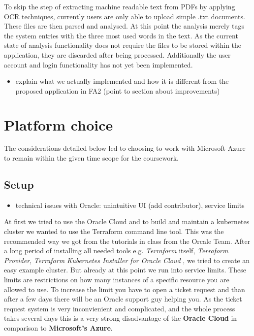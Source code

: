 \documentclass[conference]{IEEEtran}
\begin{document}
To skip the step of extracting machine readable text from PDFs by applying OCR techniques, currently users are only able to upload simple .txt documents. These files are then parsed and analysed. At this point the analysis merely tags the system entries with the three most used words in the text. As the current state of analysis functionality does not require the files to be stored within the application, they are discarded after being processed. Additionally the user account and login functionality has not yet been implemented.

\begin{itemize}
	\item explain what we actually implemented and how it is different from the proposed application in FA2 (point to section about improvements)
\end{itemize}

\section{Platform choice}
\label{sec:platform-choice}
The considerations detailed below led to choosing to work with Microsoft Azure to remain within the given time scope for the coursework.
\subsection{Setup}
\begin{itemize}
	\item technical issues with Oracle: unintuitive UI (add contributor), service limits
\end{itemize}

At first we tried to use the Oracle Cloud and to build and maintain a kubernetes cluster we wanted to use the Terraform command
line tool. This was the recommended way we got from the tutorials in class from the Orcale Team.
After a long period of installing all needed tools e.g. \textit{Terraform} itself, \textit{Terraform Provider},
\textit{Terraform Kubernetes Installer for Oracle Cloud} \cite{TerrafromK8sInstaller}, we tried to create an easy example cluster.
But already at this point we run into service limits. These limits are restrictions on how many instances of a specific resource you are
allowed to use. To increase the limit you have to open a ticket request and than after a few days there will be an Oracle support guy
helping you. As the ticket request system is very inconvienient and complicated, and the whole process takes several days this is a very strong
disadvantage of the \textbf{Oracle Cloud} in comparison to \textbf{Microsoft's Azure}.
\end{document}
